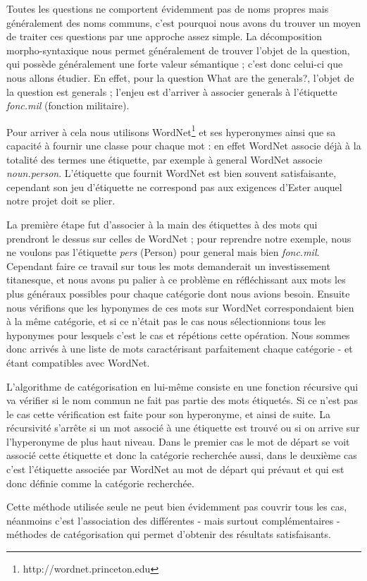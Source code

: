 \documentclass[10pt,a4paper]{article}
\begin{document}
\par Toutes les questions ne comportent évidemment pas de noms propres mais généralement des noms communs, c'est pourquoi nous avons du trouver un moyen de traiter ces questions par une approche assez simple. La décomposition morpho-syntaxique nous permet généralement de trouver l'objet de la question, qui possède généralement une forte valeur sémantique ; c'est donc celui-ci que nous allons étudier. En effet, pour la question \og{}What are the generals?\fg{}, l'objet de la question est \og{}generals\fg{} ; l'enjeu est d'arriver à associer \og{}generals\fg{} à l'étiquette \emph{fonc.mil} (fonction militaire).
\par Pour arriver à cela nous utilisons WordNet\footnote{http://wordnet.princeton.edu} et ses hyperonymes ainsi que sa capacité à fournir une classe pour chaque mot : en effet WordNet associe déjà à la totalité des termes une étiquette, par exemple à \og{}general\fg{} WordNet associe \emph{noun.person}. L'étiquette que fournit WordNet est bien souvent satisfaisante, cependant son jeu d'étiquette ne correspond pas aux exigences d'Ester auquel notre projet doit se plier.
\par La première étape fut d'associer \og{}à la main\fg{} des étiquettes à des mots qui prendront le dessus sur celles de WordNet ; pour reprendre notre exemple, nous ne voulons pas l'étiquette \emph{pers} (Person) pour \og{}general\fg{} mais bien \emph{fonc.mil}. Cependant faire ce travail sur tous les mots demanderait un investissement titanesque, et nous avons pu palier à ce problème en réfléchissant aux mots les plus généraux possibles pour chaque catégorie dont nous avions besoin. Ensuite nous vérifions que les hyponymes de ces mots sur WordNet correspondaient bien à la même catégorie, et si ce n'était pas le cas nous sélectionnions tous les hyponymes pour lesquels c'est le cas et répétions cette opération. Nous sommes donc arrivés à une liste de mots caractérisant parfaitement chaque catégorie - et étant compatibles avec WordNet.
\par L'algorithme de catégorisation en lui-même consiste en une fonction récursive qui va vérifier si le nom commun ne fait pas partie des mots étiquetés. Si ce n'est pas le cas cette vérification est faite pour son hyperonyme, et ainsi de suite. La récursivité s'arrête si un mot associé à une étiquette est trouvé ou si on arrive sur l'hyperonyme de plus haut niveau. Dans le premier cas le mot de départ se voit associé cette étiquette et donc la catégorie recherchée aussi, dans le deuxième cas c'est l'étiquette associée par WordNet au mot de départ qui prévaut et qui est donc définie comme la catégorie recherchée.
\par Cette méthode utilisée seule ne peut bien évidemment pas couvrir tous les cas, néanmoins c'est l'association des différentes - mais surtout complémentaires - méthodes de catégorisation qui permet d'obtenir des résultats satisfaisants.
\end{document}
